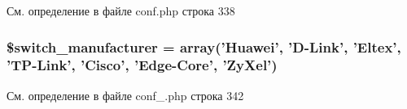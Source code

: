 См. определение в файле conf.\-php строка 338

\hypertarget{group__switch__manufacturer_ga2b1ea6f804c1caa0c3e824412fe37b16}{
\subsubsection[{\$switch\-\_\-manufacturer}]{\setlength{\rightskip}{0pt plus 5cm}\$switch\-\_\-manufacturer = array('Huawei', 'D-\/Link', 'Eltex', 'T\-P-\/Link', 'Cisco', 'Edge-\/Core', 'Zy\-Xel')}}\label{group__switch__manufacturer_ga2b1ea6f804c1caa0c3e824412fe37b16}


См. определение в файле conf\-\_\-.\-php строка 342

